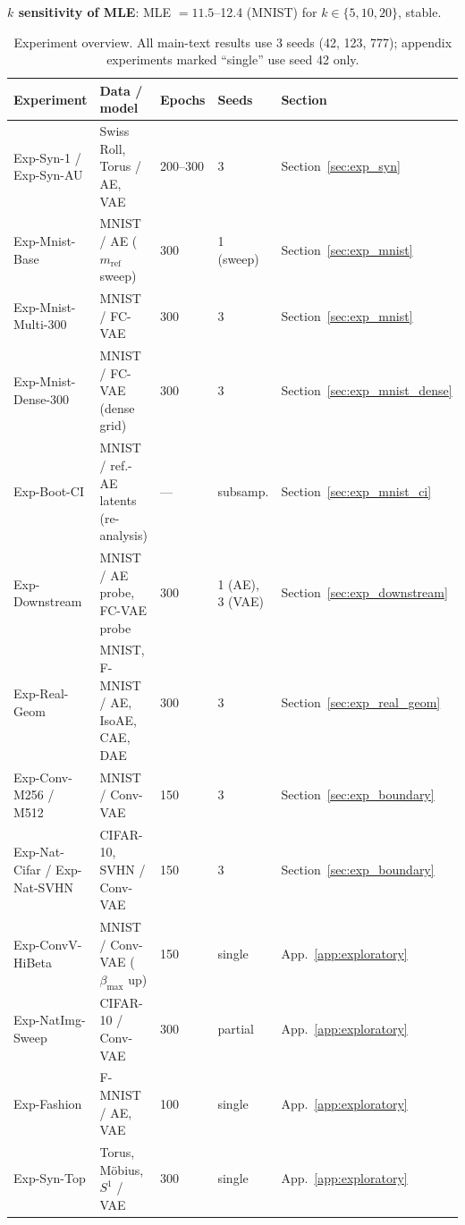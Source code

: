 \documentclass[make,article,submit,pdftex,moreauthors]{Definitions/mdpi}
\begin{document}
\textbf{$k$ sensitivity of MLE}: MLE $= 11.5$--12.4 (MNIST) for
$k \in \{5, 10, 20\}$, stable.

\begin{table}[H]
\caption{Experiment overview. All main-text results use 3 seeds
(42, 123, 777); appendix experiments marked ``single'' use seed 42 only.}
\label{tab:exp_list}
\small
\begin{tabular}{p{3.2cm}p{3.4cm}p{1.4cm}p{1.2cm}p{2.4cm}}
\toprule
\textbf{Experiment} & \textbf{Data / model} & \textbf{Epochs} & \textbf{Seeds} & \textbf{Section} \\
\midrule
Exp-Syn-1 / Exp-Syn-AU & Swiss Roll, Torus / AE, VAE & 200--300 & 3 & Section~\ref{sec:exp_syn} \\
Exp-Mnist-Base & MNIST / AE ($m_{\mathrm{ref}}$ sweep) & 300 & 1 (sweep) & Section~\ref{sec:exp_mnist} \\
Exp-Mnist-Multi-300 & MNIST / FC-VAE & 300 & 3 & Section~\ref{sec:exp_mnist} \\
Exp-Mnist-Dense-300 & MNIST / FC-VAE (dense grid) & 300 & 3 & Section~\ref{sec:exp_mnist_dense} \\
Exp-Boot-CI & MNIST / ref.-AE latents (re-analysis) & --- & subsamp. & Section~\ref{sec:exp_mnist_ci} \\
Exp-Downstream & MNIST / AE probe, FC-VAE probe & 300 & 1 (AE), 3 (VAE) & Section~\ref{sec:exp_downstream} \\
Exp-Real-Geom & MNIST, F-MNIST / AE, IsoAE, CAE, DAE & 300 & 3 & Section~\ref{sec:exp_real_geom} \\
Exp-Conv-M256 / M512 & MNIST / Conv-VAE & 150 & 3 & Section~\ref{sec:exp_boundary} \\
Exp-Nat-Cifar / Exp-Nat-SVHN & CIFAR-10, SVHN / Conv-VAE & 150 & 3 & Section~\ref{sec:exp_boundary} \\
Exp-ConvV-HiBeta & MNIST / Conv-VAE ($\beta_{\max}$ up) & 150 & single & App.~\ref{app:exploratory} \\
Exp-NatImg-Sweep & CIFAR-10 / Conv-VAE & 300 & partial & App.~\ref{app:exploratory} \\
Exp-Fashion & F-MNIST / AE, VAE & 100 & single & App.~\ref{app:exploratory} \\
Exp-Syn-Top & Torus, M\"obius, $S^1$ / VAE & 300 & single & App.~\ref{app:exploratory} \\
\bottomrule
\end{tabular}
\end{table}
\end{document}
